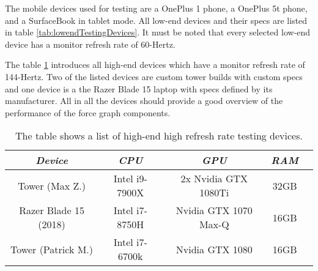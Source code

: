 The mobile devices used for testing are a OnePlus 1 phone, a OnePlus 5t phone, and a SurfaceBook in tablet mode. All low-end devices and their specs are listed in table \ref{tab:lowendTestingDevices}. It must be noted that every selected low-end device has a monitor refresh rate of 60-Hertz. 

The table \ref{tab:highendTestingDevices} introduces all high-end devices which have a monitor refresh rate of 144-Hertz. Two of the listed devices are custom tower builds with custom specs and one device is a the Razer Blade 15 laptop with specs defined by its manufacturer. All in all the devices should provide a good overview of the performance of the force graph components.

\begin{table}
  \centering
  \begin{threeparttable}
    \caption{The table shows a list of high-end high refresh rate testing devices.}
    \label{tab:highendTestingDevices}
    \centering
    \def\rr{\rightskip=0pt plus1em \spaceskip=.3333em \xspaceskip=.5em\relax}
    \setlength{\tabcolsep}{1ex}
    \def\arraystretch{1.20}
    \setlength{\tabcolsep}{1ex}
    \small
    \begin{english}
      \begin{tabular}{|c||c|c|c|c|}
        \hline
          \multicolumn{1}{|c||}{\emph{Device}}&
          \multicolumn{1}{|c}{\emph{CPU}} &
          \multicolumn{1}{|c}{\emph{GPU}} &
          \multicolumn{1}{|c|}{\emph{RAM}} \\
        \hline
        \hline
        Tower (Max Z.) & 
        Intel i9-7900X & 
        2x Nvidia GTX 1080Ti & 
        32GB \\
        \hline
        Razer Blade 15 (2018) & 
        Intel i7-8750H & 
        Nvidia GTX 1070 Max-Q  & 
        16GB \\
        \hline
        Tower (Patrick M.) &
        Intel i7-6700k & 
        Nvidia GTX 1080 & 
        16GB \\
        \hline
      \end{tabular}  
    \end{english}
  \end{threeparttable}
\end{table}

